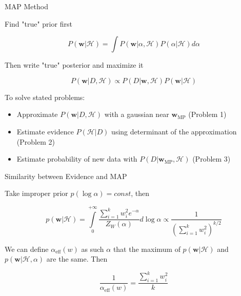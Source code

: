 \documentclass[10pt]{beamer}
\theoremstyle{definition}
\begin{document}
	\begin{frame}{MAP Method}
		
		Find "true" prior first 
		
		\begin{equation*}
			P(\mathbf{w} | \mathcal{H}) = \int P(\mathbf{w} | \alpha, \mathcal{H}) P(\alpha | \mathcal{H}) d\alpha
		\end{equation*}
		
		Then write "true" posterior and maximize it
		
		\begin{equation*}
			P(\mathbf{w} | D, \mathcal{H}) \propto P(D | \mathbf{w}, \mathcal{H}) P(\mathbf{w} | \mathcal{H})
		\end{equation*}
		
		To solve stated problems:
		
		\begin{itemize}
			\item Approximate $ P(\mathbf{w} | D, \mathcal{H}) $ with a gaussian near $ \mathbf{w}_{\text{MP}} $ (Problem 1)
			\item Estimate evidence $ P(\mathcal{H} | D) $ using determinant of the approximation (Problem 2)
			\item Estimate probability of new data with $ P(D | \mathbf{w}_{\text{MP}}, \mathcal{H}) $ (Problem 3)
		\end{itemize}
		
	\end{frame}
	
	\begin{frame}{Similarity between Evidence and MAP}
		
		Take improper prior $ p(\log \alpha) = const $, then 
		
		\begin{equation*}
			p(\mathbf{w} | \mathcal{H}) = \int\limits_{0}^{+\infty} \dfrac{ \sum\limits_{i = 1}^k w_i^2 e^{-\alpha}}{Z_W(\alpha)} d\log \alpha \propto \frac{1}{(\sum\limits_{i = 1}^k w_i^2)^{k / 2}}
		\end{equation*}
		
		We can define $ \alpha_{\text{eff}}(w) $ as such $ \alpha $ that the maximum of $ p(\mathbf{w} | \mathcal{H}) $ and $ p(\mathbf{w} | \mathcal{H}, \alpha) $ are the same. Then
		
		\begin{equation}\label{eq:implied MAP}
			\frac{1}{\alpha_{\text{eff}}(w)} = \frac{\sum\limits_{i = 1}^k w_i^2}{k}
		\end{equation}
		
	\end{frame}
	
\end{document}
